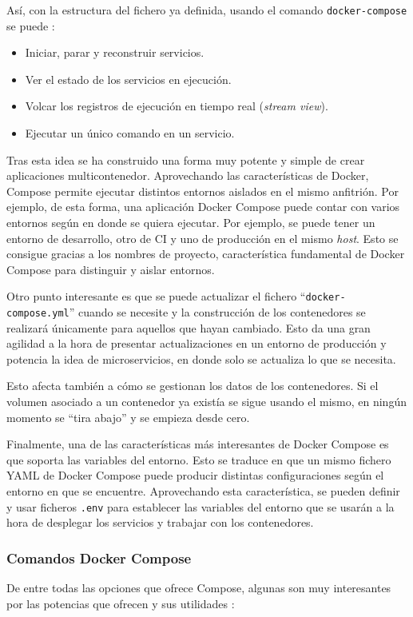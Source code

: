 Así, con la estructura del fichero ya definida, usando el comando \texttt{docker-compose}
se puede \cite{OverviewDockerCompose2021}:
\begin{itemize}
    \item Iniciar, parar y reconstruir servicios.
    \item Ver el estado de los servicios en ejecución.
    \item Volcar los registros de ejecución en tiempo real (\textit{stream view}).
    \item Ejecutar un único comando en un servicio.
\end{itemize}

Tras esta idea se ha construido una forma muy potente y simple de crear aplicaciones
multicontenedor. Aprovechando las características de Docker, Compose permite 
ejecutar distintos entornos aislados en el mismo anfitrión. Por ejemplo, de esta
forma, una aplicación Docker Compose puede contar con varios entornos según
en donde se quiera ejecutar. Por ejemplo, se puede tener un entorno de desarrollo,
otro de CI y uno de producción en el mismo \textit{host}. Esto se consigue gracias
a los nombres de proyecto, característica fundamental de Docker Compose para
distinguir y aislar entornos.

Otro punto interesante es que se puede actualizar el fichero ``\texttt{docker-compose.yml}''
cuando se necesite y la construcción de los contenedores se realizará únicamente
para aquellos que hayan cambiado. Esto da una gran agilidad a la hora de 
presentar actualizaciones en un entorno de producción y potencia la idea de
microservicios, en donde solo se actualiza lo que se necesita.

Esto afecta también a cómo se gestionan los datos de los contenedores. Si el 
volumen asociado a un contenedor ya existía se sigue usando el mismo, en ningún
momento se ``tira abajo'' y se empieza desde cero.

Finalmente, una de las características más interesantes de Docker Compose es que
soporta las variables del entorno. Esto se traduce en que un mismo fichero
YAML de Docker Compose puede producir distintas configuraciones según el
entorno en que se encuentre. Aprovechando esta característica, se pueden definir
y usar ficheros \texttt{.env} para establecer las variables del entorno que
se usarán a la hora de desplegar los servicios y trabajar con los contenedores.

\subsubsection*{Comandos Docker Compose}
De entre todas las opciones que ofrece Compose, algunas son muy interesantes por
las potencias que ofrecen y sus utilidades \cite{DockerComposeTutorial}:

